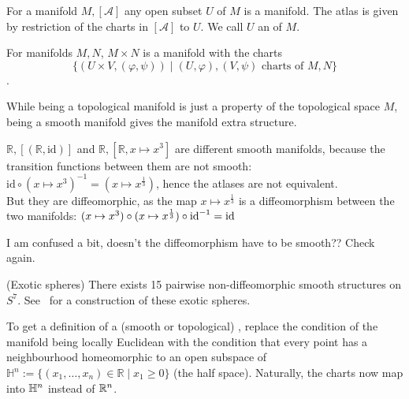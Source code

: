 \documentclass[a4paper,11pt]{article}
\begin{document}
\begin{example}
    For a manifold \(M,[\mathcal{A}]\) any open subset \(U\) of \(M\) is a manifold. The atlas is given by restriction of the charts in \([\mathcal{A}]\) to \(U\). We call \(U\) an  of \(M\).
\end{example}

\begin{example}
    For manifolds \(M,N\), \(M\times N\) is a manifold with the charts\[\{(U\times V,(\varphi,\psi))\mid(U,\varphi),(V,\psi)\text{ charts of }M,N\}\].
\end{example}

\begin{remark}
    While being a topological manifold is just a property of the topological space \(M\), being a smooth manifold gives the manifold extra structure.
\end{remark}

\begin{example}
    \(\mathbb{R},[(\mathbb{R},\mathrm{id})]\) and \(\mathbb{R},[\mathbb{R},x\mapsto x^3]\) are different smooth manifolds, because the transition functions between them are not smooth: \(\mathrm{id}\circ(x\mapsto x^3)^{-1}=(x\mapsto x^{\frac13})\), hence the atlases are not equivalent.\\
    But they are diffeomorphic, as the map \(x\mapsto x^{\frac{1}{3}}\) is a diffeomorphism between the two manifolds: \((x\mapsto x^3)\circ (x\mapsto x^{\frac13})\circ \mathrm{id}^{-1}= \mathrm{id}\)
\end{example}

I am confused a bit, doesn't the diffeomorphism have to be smooth?? Check again.

\begin{example}(Exotic spheres)
    There exists 15 pairwise non-diffeomorphic smooth structures on \(S^7\). See\ \cite{kervaire} for a construction of these exotic spheres.
\end{example}

\begin{definition}
    To get a definition of a (smooth or topological) , replace the condition of the manifold being locally Euclidean with the condition that every point has a neighbourhood homeomorphic to an open subspace of \(\mathbb{H}^n:=\{(x_1,\dots,x_n)\in\mathbb{R}\mid x_1\geq0\}\) (the half space). Naturally, the charts now map into \(\mathbb{H}^n\) instead of \(\mathbb{R}^n\).
\end{definition}
\end{document}

